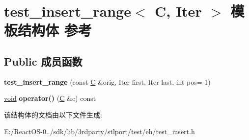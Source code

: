 \hypertarget{structtest__insert__range}{}\section{test\+\_\+insert\+\_\+range$<$ C, Iter $>$ 模板结构体 参考}
\label{structtest__insert__range}
\subsection*{Public 成员函数}
\begin{DoxyCompactItemize}
\item 
\mbox{\label{structtest__insert__range_ace439122edebd6c8f6007de4e70d9d69}} 
{\bfseries test\+\_\+insert\+\_\+range} (const \hyperlink{struct_c}{C} \&orig, Iter first, Iter last, int pos=-\/1)
\item 
\mbox{\label{structtest__insert__range_a931932a4d1dce3cad893e50440de31f7}} 
\hyperlink{interfacevoid}{void} {\bfseries operator()} (\hyperlink{struct_c}{C} \&c) const
\end{DoxyCompactItemize}


该结构体的文档由以下文件生成\+:\begin{DoxyCompactItemize}
\item 
E\+:/\+React\+O\+S-\/0../sdk/lib/3rdparty/stlport/test/eh/test\+\_\+insert.\+h\end{DoxyCompactItemize}
